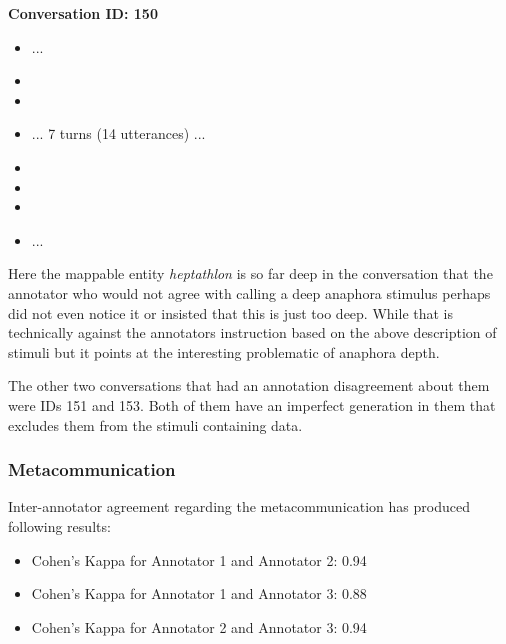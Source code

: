 \textbf{Conversation ID: 150}

\begin{itemize}[label={}, leftmargin=0pt, itemsep=0.5em]
\item ...
\item {}
\item {}
\item ... 7 turns (14 utterances) ...
\item {}
\item {}
\item {}
\item ...
\end{itemize}

Here the mappable entity \textit{heptathlon} is so far deep in the conversation that
the annotator who would not agree with calling a deep anaphora stimulus
perhaps did not even notice it or insisted that this is just too deep.
While that is technically against the annotators instruction based on the above description of stimuli
but it points at the interesting problematic of anaphora depth.

The other two conversations that had an annotation disagreement about them were IDs 151 and 153.
Both of them have an imperfect generation in them that excludes them from the stimuli containing data.

\subsubsection{Metacommunication}

Inter-annotator agreement regarding the metacommunication has produced following results:

\begin{itemize}
\item Cohen's Kappa for Annotator 1 and Annotator 2: 0.94
\item Cohen's Kappa for Annotator 1 and Annotator 3: 0.88
\item Cohen's Kappa for Annotator 2 and Annotator 3: 0.94
\end{itemize}

